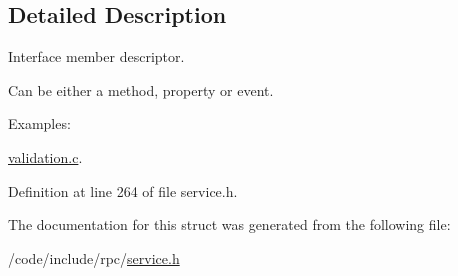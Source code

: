 \subsection{Detailed Description}
Interface member descriptor.

Can be either a method, property or event. \begin{Desc}
\item[Examples\+: ]\par
\hyperlink{validation_8c-example}{validation.\+c}.\end{Desc}


Definition at line 264 of file service.\+h.



The documentation for this struct was generated from the following file\+:\begin{DoxyCompactItemize}
\item 
/code/include/rpc/\hyperlink{service_8h}{service.\+h}\end{DoxyCompactItemize}
